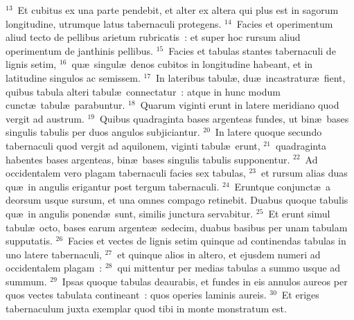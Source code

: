 ${}^{13}$~Et cubitus ex una parte pendebit, et alter ex altera qui plus est in sagorum longitudine, utrumque latus tabernaculi protegens.
${}^{14}$~Facies et operimentum aliud tecto de pellibus arietum rubricatis~: et super hoc rursum aliud operimentum de janthinis pellibus.
${}^{15}$~Facies et tabulas stantes tabernaculi de lignis setim,
${}^{16}$~qu\ae\ singul\ae\ denos cubitos in longitudine habeant, et in latitudine singulos ac semissem.
${}^{17}$~In lateribus tabul\ae , du\ae\ incastratur\ae\ fient, quibus tabula alteri tabul\ae\ connectatur~: atque in hunc modum cunct\ae\ tabul\ae\ parabuntur.
${}^{18}$~Quarum viginti erunt in latere meridiano quod vergit ad austrum.
${}^{19}$~Quibus quadraginta bases argenteas fundes, ut bin\ae\ bases singulis tabulis per duos angulos subjiciantur.
${}^{20}$~In latere quoque secundo tabernaculi quod vergit ad aquilonem, viginti tabul\ae\ erunt,
${}^{21}$~quadraginta habentes bases argenteas, bin\ae\ bases singulis tabulis supponentur.
${}^{22}$~Ad occidentalem vero plagam tabernaculi facies sex tabulas,
${}^{23}$~et rursum alias duas qu\ae\ in angulis erigantur post tergum tabernaculi.
${}^{24}$~Eruntque conjunct\ae\ a deorsum usque sursum, et una omnes compago retinebit. Duabus quoque tabulis qu\ae\ in angulis ponend\ae\ sunt, similis junctura servabitur.
${}^{25}$~Et erunt simul tabul\ae\ octo, bases earum argente\ae\ sedecim, duabus basibus per unam tabulam supputatis.
${}^{26}$~Facies et vectes de lignis setim quinque ad continendas tabulas in uno latere tabernaculi,
${}^{27}$~et quinque alios in altero, et ejusdem numeri ad occidentalem plagam~:
${}^{28}$~qui mittentur per medias tabulas a summo usque ad summum.
${}^{29}$~Ipsas quoque tabulas deaurabis, et fundes in eis annulos aureos per quos vectes tabulata contineant~: quos operies laminis aureis.
${}^{30}$~Et eriges tabernaculum juxta exemplar quod tibi in monte monstratum est.


